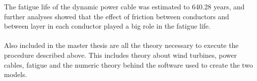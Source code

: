 The fatigue life of the dynamic power cable was estimated to 640.28 years, and further analyses showed that the effect of friction between conductors and between layer in each conductor played a big role in the fatigue life. \\\\
Also included in the master thesis are all the theory necessary to execute the procedure described above. This includes theory about wind turbines, power cables, fatigue and the numeric theory behind the software used to create the two models. 

